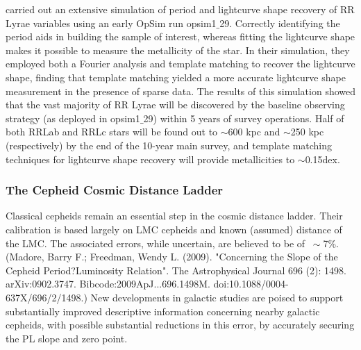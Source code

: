\citet{2012AJ....144....9O} carried out an extensive simulation of period
and lightcurve shape recovery of RR Lyrae variables using an early OpSim run
opsim1$\_$29. Correctly identifying the period aids in building the sample of
interest, whereas fitting the lightcurve shape makes it possible to measure the
metallicity of the star. In their simulation, they employed both a Fourier
analysis and template matching to recover the lightcurve shape, finding that
template matching yielded a more accurate lightcurve shape measurement in the
presence of sparse data. The results of this simulation showed that the vast
majority of RR Lyrae will be discovered by the baseline observing strategy (as
deployed in opsim1$\_$29) within 5 years of survey operations. Half of both
RRLab and RRLc stars will be found out to $\sim$600 kpc and $\sim$250 kpc
(respectively) by the end of the 10-year main survey, and template matching
techniques for lightcurve shape recovery will provide metallicities to
$\sim$0.15dex.


\subsubsection{The Cepheid Cosmic Distance Ladder}

Classical cepheids remain an essential step in the cosmic distance
ladder. Their calibration is based largely on LMC cepheids and known
(assumed) distance of the LMC.  The associated errors, while uncertain,
are believed to be of $\>\sim$7\%. (Madore, Barry F.; Freedman, Wendy L.
(2009). "Concerning the Slope of the Cepheid Period?Luminosity
Relation". The Astrophysical Journal 696 (2): 1498. arXiv:0902.3747.
Bibcode:2009ApJ...696.1498M. doi:10.1088/0004-637X/696/2/1498.) New
developments in galactic studies are poised to support substantially
improved descriptive information concerning nearby galactic cepheids,
with possible substantial reductions in this error, by accurately
securing the PL slope and zero point.

